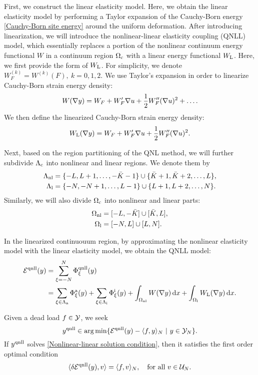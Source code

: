 	First, we construct the linear elasticity model. Here, we obtain the linear elasticity model by performing a Taylor expansion of the Cauchy-Born energy \eqref{Cauchy-Born site energy} around the uniform deformation. After introducing linearization, we will introduce the nonlinear-linear elasticity coupling (QNLL) model, which essentially replaces a portion of the nonlinear continuum energy functional $W$ in a continuum region $\Omega_{{\rm c}}$ with a linear energy functional $W_{{\rm L}}$. Here, we first provide the form of $W_{{\rm L}}$. For simplicity, we denote $W^{(k)}_{F} = W^{(k)}(F),\ k =0,1,2$. We use Taylor's expansion in order to linearize Cauchy-Born strain energy density: 
	\begin{equation*}
		W(\nabla y) = W_F+W^{\prime}_F\nabla u+\frac{1}{2}W^{\prime \prime}_F(\nabla u)^{2} +\dots.
	\end{equation*}
	We then define the linearized Cauchy-Born strain energy density:
	\begin{equation*}
		W_{{\rm L}}(\nabla y) = W_F+W^{\prime}_F\nabla u+\frac{1}{2}W^{\prime \prime}_F(\nabla u)^{2}.
	\end{equation*}
	
	Next, based on the region partitioning of the QNL method, we will further subdivide $\Lambda_{\rm c}$ into nonlinear and linear regions. We denote them by
	\begin{align*}
		\Lambda_{{\rm nl}} &= \{- L,L+1,\dots,-\bar{K}-1\}\cup\{\bar{K}+1, \bar{K}+2,\dots,L\},\\
		\Lambda_{{\rm l}} &=\{-N,-N+1,\dots,L-1\}\cup \{L+1,L+2,\dots,N\}.
	\end{align*}
	Similarly, we will also divide $\Omega_{{\rm c}}$ into nonlinear and linear parts:
	\begin{align*}
		\Omega_{{\rm nl}} &=[-L,-\bar{K}] \cup [\bar{K},L],\\
		\Omega_{{\rm l}} &=[-N,L] \cup [L,N].
	\end{align*}
	
	In the linearized continuouum region, by approximating the nonlinear elasticity model with the linear elasticity model, we obtain the QNLL model:
	\begin{align}\label{Nonlinear-linear energy}
		\mathcal{E}^{{\rm qnll}} (y) &= \sum_{\xi = -N}^{N}\Phi^{{\rm qnll}}_{\xi}(y) \nonumber \\
		&=\sum_{\xi \in \Lambda_{\rm a}}\Phi^{{\rm a}}_{\xi}(y) + \sum_{\xi \in \Lambda_{\rm i}}\Phi^{{\rm i}}_{\xi}(y) + \int_{\Omega_{{\rm nl}}} W(\nabla y)\,\text{d} x + \int_{\Omega_{{\rm l}}} W_{{\rm L}}(\nabla y)\,\text{d} x.
	\end{align}
	
	
	Given a dead load $f\in \mathcal{Y}$, we seek
	\begin{equation}\label{Nonlinear-linear solution condition}
		y^{{\rm qnll}} \in \arg \min \{\mathcal{E}^{{\rm qnll}} (y) - \langle f,y\rangle_{N} \ | \ y \in \mathcal{Y}_{N}\}.
	\end{equation}
	If $y^{{\rm qnll}}$ solves \eqref{Nonlinear-linear solution condition}, then it satisfies the first order optimal condition
	\begin{equation}\label{QNLL solution first order optimality condition}
		\langle \delta \mathcal{E}^{{\rm qnll}}(y),v \rangle = \langle f,v\rangle_{N}, \quad \text{for all }v \in \mathcal{U}_{N}.
	\end{equation}